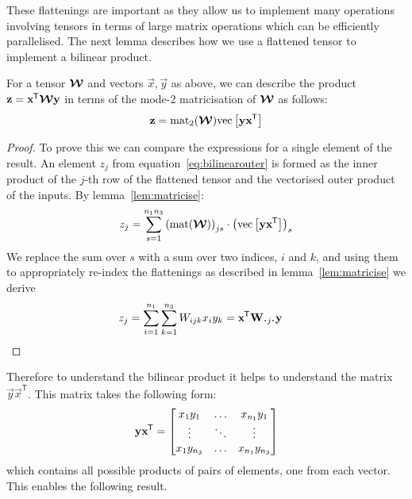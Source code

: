 These flattenings are important as they allow us to
implement many operations involving tensors in terms of large matrix operations which can be efficiently
parallelised. The next lemma describes how we use a flattened tensor to implement a bilinear product.

\begin{lem}\label{lem:outerprod}
For a tensor \(\bm{\mathcal{W}}\) and vectors \(\vec{x}, \vec{y}\) as above,
we can describe the product \(\mathbf{z} = \mathbf{x}^{\mkern-1.5mu\mathsf{T}}\bm{\mathcal{W}}\mathbf{y}\) in terms of the
mode-2 matricisation of \(\bm{\mathcal{W}}\) as 
follows:
\begin{align}
	\mathbf{z} = \operatorname{mat}_2(\bm{\mathcal{W}})\mathrm{vec}\left[\mathbf{y}\mathbf{x}^{\mkern-1.5mu\mathsf{T}}\right]
	\label{eq:bilinearouter}
\end{align}
\end{lem}

\begin{proof}
To
prove this we can compare the expressions for a single element of the result.
An element \(z_j\) from equation~\eqref{eq:bilinearouter}
is formed as the inner product of the \(j\)-th
row of the flattened tensor and the vectorised outer product of the inputs. By 
lemma~\ref{lem:matricise}:
\begin{equation}
	z_j = 
	\sum_{s=1}^{n_1n_3} \left(\operatorname{mat}(\bm{\mathcal{W}})\right)_{js} \cdot
	\left( \operatorname{vec}\left[\mathbf{y}\mathbf{x}^{\mkern-1.5mu\mathsf{T}}\right]\right)_s
\end{equation}
We replace the sum over \(s\) with a sum over two
indices, \(i\) and \(k\), and using them to appropriately re-index the flattenings 
as described in lemma~\ref{lem:matricise} we 
derive
\begin{align}
	z_j &= \sum_{i=1}^{n_1}\sum_{k=1}^{n_3} W_{ijk} x_i y_k 
		= \tran{\vec{x}}\mat{W}_{\midbullet j \midbullet}\vec{y}
\end{align}

\end{proof}


Therefore to understand the bilinear product it helps to understand the matrix 
\(\vec{y}\vec{x}^\mathsf{T}\). This matrix takes the following form:
\begin{equation}\label{eq:outer}
	\mathbf{y}\mathbf{x}^{\mkern-1.5mu\mathsf{T}} = \begin{bmatrix}
		x_1y_1 & \ldots & x_{n_1}y_1 \\
		\vdots & \ddots & \vdots \\
		x_1y_{n_3} & \ldots & x_{n_1}y_{n_3}
	\end{bmatrix}
\end{equation} which contains all possible products of pairs of elements, one from each vector. 
This enables the following result.

